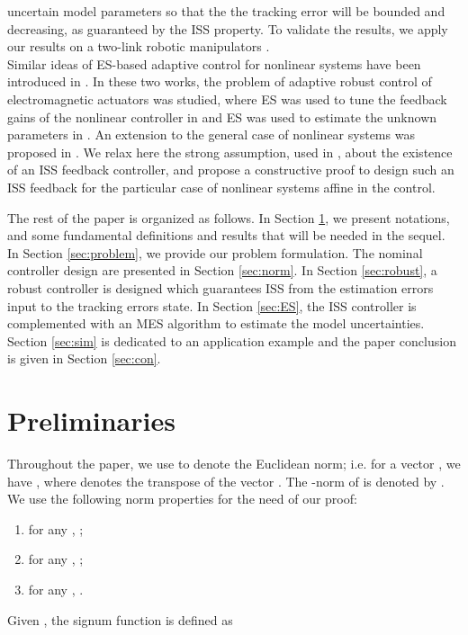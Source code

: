 \documentclass[twoside,leqno,onecolumn]{article}
\begin{document}
uncertain model parameters so that the the tracking error will be
bounded and decreasing, as guaranteed by the ISS property. To
validate the results, we apply our results on a two-link robotic
manipulators \cite{Spong92}.\\ Similar ideas of ES-based adaptive
control for nonlinear systems have been introduced in
\cite{Beno13,Atinc13}. In these two works, the problem of adaptive
robust control of electromagnetic actuators was studied, where ES
was used to tune the feedback gains of the nonlinear controller in
\cite{Beno13} and ES was used to estimate the unknown parameters
in \cite{Atinc13}. An extension to the general case of nonlinear
systems was proposed in \cite{ben_ifac14,ben_ECC14}. We relax here
the strong assumption, used in \cite{ben_ifac14,ben_ECC14}, about
the existence of an ISS feedback controller, and propose a
constructive proof to design such an ISS feedback for the
particular case of nonlinear systems affine in the control.






The rest of the paper is organized as follows. In Section
\ref{sec:pre}, we present notations, and some fundamental
definitions and results that will be needed in the sequel. In
Section \ref{sec:problem}, we provide our problem formulation. The
nominal controller design are presented in Section \ref{sec:norm}.
In Section \ref{sec:robust}, a robust controller is designed which
guarantees ISS from the estimation errors input to the tracking
errors state. In Section \ref{sec:ES}, the ISS controller is
complemented with an MES algorithm to estimate the model
uncertainties. Section \ref{sec:sim} is dedicated to an
application example and the paper conclusion is given in Section
\ref{sec:con}.



\section{Preliminaries}
\label{sec:pre} Throughout the paper, we use  to denote
the Euclidean norm; i.e. for a vector , we have
, where  denotes the
transpose of the vector .  The -norm of 
is denoted by . We use the following norm properties for
the need of our proof:
\begin{enumerate}
\item for any , ;
\item for any , ;
\item for any , .
\end{enumerate}
Given , the signum function is defined as
\end{document}
